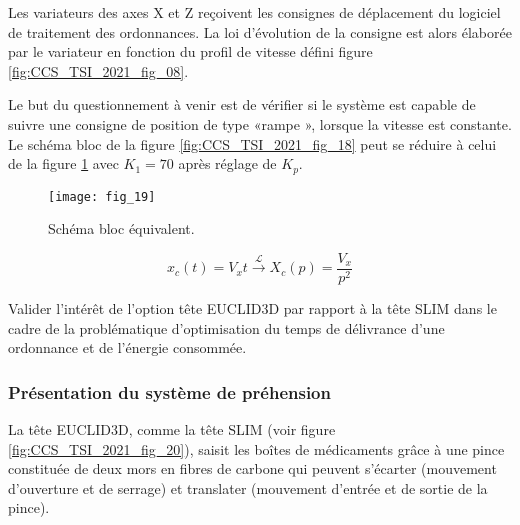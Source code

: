 
Les variateurs des axes X et Z reçoivent les consignes de déplacement du logiciel de traitement des ordonnances. La loi d'évolution de la consigne est alors élaborée par le variateur en fonction du profil de vitesse défini figure \ref{fig:CCS_TSI_2021_fig_08}.

Le but du questionnement à venir est de vérifier si le système est capable de suivre une consigne de position de type «rampe », lorsque la vitesse est constante. Le schéma bloc de la figure \ref{fig:CCS_TSI_2021_fig_18} peut se réduire à celui de la figure \ref{fig:CCS_TSI_2021_fig_19} avec $K_{1}=70$ après réglage de $K_{p}$.

\begin{figure}
\centering
\texttt{[image: fig\_19]}

\caption{\label{fig:CCS_TSI_2021_fig_19}Schéma bloc équivalent.}
\end{figure}



$$
x_{c}(t)=V_{x} t \stackrel{\mathcal{L}}{\rightarrow} X_{c}(p)=\frac{V_{x}}{p^{2}}
$$


\begin{obj}
Valider l'intérêt de l'option tête EUCLID3D par rapport à la tête SLIM dans le cadre de la problématique d'optimisation du temps de délivrance d'une ordonnance et de l'énergie consommée.
\end{obj}

\subsubsection{Présentation du système de préhension}
La tête EUCLID3D, comme la tête SLIM (voir figure \ref{fig:CCS_TSI_2021_fig_20}), saisit les boîtes de médicaments grâce à une pince constituée de deux mors en fibres de carbone qui peuvent s'écarter (mouvement d'ouverture et de serrage) et translater (mouvement d'entrée et de sortie de la pince).

